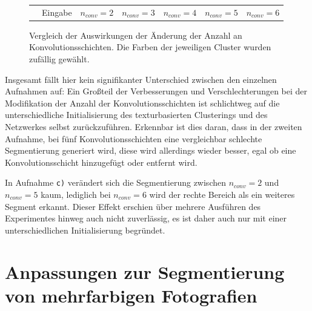 \begin{figure}[h!]
\begin{tabular}{m{15pt}m{}m{}m{}m{}m{}m{}}
		&
		\hspace{2pt}\newline\centering Eingabe & 
		\hspace{2pt}\newline\centering $n_{conv}=2$ &
		\hspace{2pt}\newline\centering $n_{conv}=3$ &
		\hspace{2pt}\newline\centering $n_{conv}=4$ &
		\hspace{2pt}\newline\centering $n_{conv}=5$ &
		\hspace{2pt}\newline\centering $n_{conv}=6$ 
	\end{tabular}
	\caption{Vergleich der Auswirkungen der Änderung der Anzahl an Konvolutionsschichten. Die Farben der jeweiligen Cluster wurden zufällig gewählt.}
	\label{fig:n_layers_comparision}
\end{figure}

Insgesamt fällt hier kein signifikanter Unterschied zwischen den einzelnen Aufnahmen auf: Ein Großteil der Verbesserungen und Verschlechterungen bei der Modifikation der Anzahl der Konvolutionsschichten ist schlichtweg auf die unterschiedliche Initialisierung des texturbasierten Clusterings und des Netzwerkes selbst zurückzuführen. Erkennbar ist dies daran, dass in der zweiten Aufnahme, bei fünf Konvolutionsschichten eine vergleichbar schlechte Segmentierung generiert wird, diese wird allerdings wieder besser, egal ob eine Konvolutionsschicht hinzugefügt oder entfernt wird.

In Aufnahme \texttt{c)} verändert sich die Segmentierung zwischen $n_{conv}=2$ und $n_{conv}=5$ kaum, lediglich bei $n_{conv}=6$ wird der rechte Bereich als ein weiteres Segment erkannt. Dieser Effekt erschien über mehrere Ausführen des Experimentes hinweg auch nicht zuverlässig, es ist daher auch nur mit einer unterschiedlichen Initialisierung begründet.

\section{Anpassungen zur Segmentierung von mehrfarbigen Fotografien}
\label{sec:color_picture_optimization}